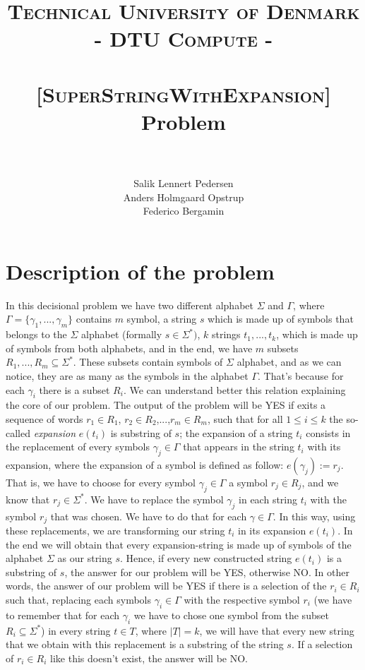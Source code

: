 \documentclass[paper=a4, fontsize=11pt]{scrartcl}
\title{
		\usefont{OT1}{bch}{b}{n}
		\normalfont \normalsize \textsc{Technical University of Denmark - DTU Compute -} \\ [20pt]
		\horrule{0.5pt} \\[0.4cm]
		\LARGE \textsc{[SuperStringWithExpansion]} Problem \\
		\horrule{2pt} \\[0.5cm]
}
\author{
		\normalfont 							
        Salik Lennert Pedersen \\
        Anders Holmgaard Opstrup \\
        Federico Bergamin \\ [-3pt]		\normalsize
}
\date{}
\numberwithin{equation}{section}		%
\numberwithin{figure}{section}			%
\numberwithin{table}{section}				%
\begin{document}
\maketitle
\section{Description of the problem}
In this decisional problem we have two different alphabet $\mathcal{\Sigma}$ and $\mathcal{\Gamma}$, where $\mathcal{\Gamma}=\{\gamma_1,...,\gamma_m\}$ contains $m$ symbol, a string $s$ which is made up of symbols that belongs to the  $\mathcal{\Sigma}$ alphabet (formally $s\in\mathcal{\Sigma^*})$, $k$ strings $t_1,...,t_k$, which is made up of symbols from both alphabets, and in the end, we have $m$ subsets $R_1,...,R_m \subseteq \mathcal{\Sigma^*}$. These subsets contain symbols of $\mathcal{\Sigma}$ alphabet, and as we can notice, they are as many as the symbols in the alphabet $\mathcal{\Gamma}$. That's because for each $\gamma_i$ there is a subset $R_i$. We can understand better this relation explaining the core of our problem. \newline
\noindent The output of the problem will be YES if exits a sequence of words $r_1\in R_1$, $r_2\in R_2$,...,$r_m\in R_m$, such that for all $1 \leq i \leq k$ the so-called \textit{expansion} $e(t_i)$ is substring of $s$; the expansion of a string $t_i$ consists in the replacement of every symbols $\gamma_j \in \mathcal{\Gamma}$ that appears in the string $t_i$ with its expansion, where the expansion of a symbol is defined as follow: $e(\gamma_j):=r_j$. That is, we have to choose for every symbol $\gamma_j\in \mathcal{\Gamma}$ a symbol $r_j\in R_j$, and we know that $r_j \in\mathcal{\Sigma^*}$. We have to replace the symbol $\gamma_j$ in each string $t_i$ with the symbol $r_j$ that was chosen. We have to do that for each $\gamma \in \mathcal{\Gamma}$. In this way, using these replacements, we are transforming our string $t_i$ in its expansion $e(t_i)$. \newline 
In the end we will obtain that every expansion-string is made up of symbols of the alphabet $\mathcal{\Sigma}$ as our string $s$. Hence, if every new constructed string $e(t_i)$ is a substring of $s$, the answer for our problem will be YES, otherwise NO.
\newline
In other words, the answer of our problem will be YES if there is a selection of the $r_i \in R_i$ such that, replacing each symbols $\gamma_i \in \Gamma$ with the respective symbol $r_i$ (we have to remember that for each $\gamma_i$ we have to chose one symbol from the subset $R_i \subseteq \Sigma^*$) in every string $t\in T$, where $|T|=k$, we will have that every new string that we obtain with this replacement is a substring of the string $s$. 
If a selection of $r_i \in R_i$ like this doesn't exist, the answer will be NO.
\end{document}
